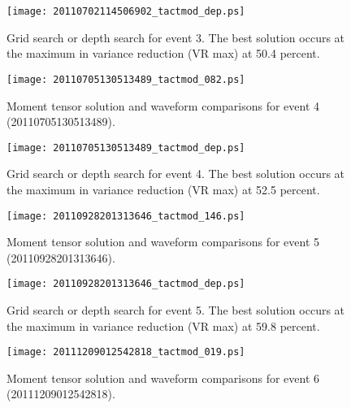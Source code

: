 \documentclass[11pt,titlepage,fleqn]{article}
\begin{document}
\begin{figure}
\centering
\texttt{[image: 20110702114506902\_tactmod\_dep.ps]}
\caption[Depth search solution for event 3]
{{
Grid search or depth search for event 3. The best solution occurs at the maximum in variance reduction (VR max) at 50.4 percent.
\label{fig:20110702114506902_dep}
}}
\end{figure}



\begin{figure}
\centering
\texttt{[image: 20110705130513489\_tactmod\_082.ps]}
\caption[Moment tensor solution for event 4]
{{
Moment tensor solution and waveform comparisons for event 4 (20110705130513489).
\label{fig:20110705130513489}
}}
\end{figure} 


\begin{figure}
\centering
\texttt{[image: 20110705130513489\_tactmod\_dep.ps]}
\caption[Depth search solution for event 4]
{{
Grid search or depth search for event 4. The best solution occurs at the maximum in variance reduction (VR max) at 52.5 percent.
\label{fig:20110705130513489_dep}
}}
\end{figure}




\begin{figure}
\centering
\texttt{[image: 20110928201313646\_tactmod\_146.ps]}
\caption[Moment tensor solution for event 5]
{{
Moment tensor solution and waveform comparisons for event 5 (20110928201313646).
\label{fig:201109282013136469}
}}
\end{figure} 

\clearpage\pagebreak

\begin{figure}
\centering
\texttt{[image: 20110928201313646\_tactmod\_dep.ps]}
\caption[Depth search solution for event 5]
{{
Grid search or depth search for event 5. The best solution occurs at the maximum in variance reduction (VR max) at 59.8 percent.
\label{fig:20110928201313646_dep}
}}
\end{figure}

\clearpage\pagebreak


\begin{figure}
\centering
\texttt{[image: 20111209012542818\_tactmod\_019.ps]}
\caption[Moment tensor solution for event 6]
{{
Moment tensor solution and waveform comparisons for event 6 (20111209012542818).
\label{fig:20111209012542818}
}}
\end{figure} 
\end{document}
